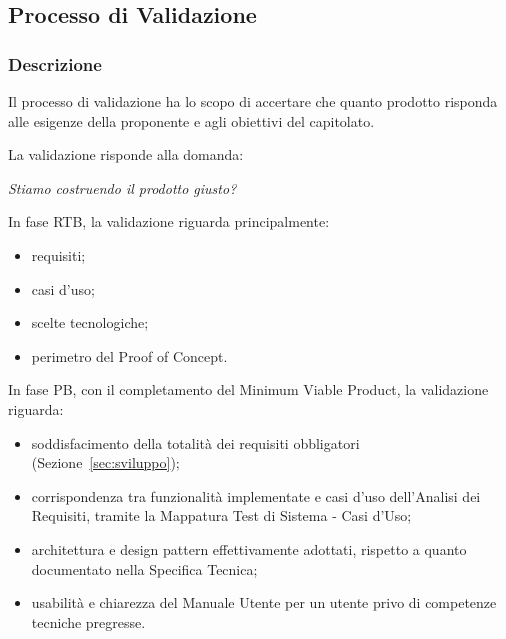 
\subsection{Processo di Validazione}
\label{sec:validazione}

\subsubsection{Descrizione}

Il processo di validazione ha lo scopo di accertare che quanto prodotto risponda
alle esigenze della proponente e agli obiettivi del capitolato.

La validazione risponde alla domanda:

\begin{center}
    \textit{Stiamo costruendo il prodotto giusto?}
\end{center}

In fase RTB, la validazione riguarda principalmente:

\begin{itemize}
    \item requisiti;
    \item casi d'uso;
    \item scelte tecnologiche;
    \item perimetro del Proof of Concept.
\end{itemize}

In fase PB, con il completamento del Minimum Viable Product, la validazione riguarda:

\begin{itemize}
    \item soddisfacimento della totalità dei requisiti obbligatori (Sezione~\ref{sec:sviluppo});
    \item corrispondenza tra funzionalità implementate e casi d'uso dell'Analisi dei Requisiti, tramite la Mappatura Test di Sistema - Casi d'Uso;
    \item architettura e design pattern effettivamente adottati, rispetto a quanto documentato nella Specifica Tecnica;
    \item usabilità e chiarezza del Manuale Utente per un utente privo di competenze tecniche pregresse.
\end{itemize}


